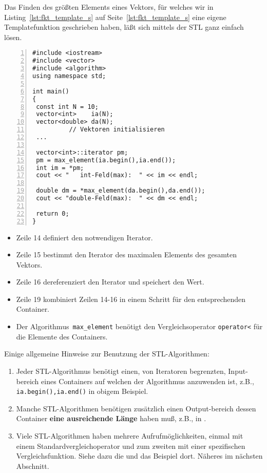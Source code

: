 Das Finden des größten Elements eines Vektors, für welches wir in Listing~\ref{lst:fkt_template_s}
auf Seite~\ref{lst:fkt_template_s} eine eigene Templatefunktion geschrieben haben, läßt sich mittels
der STL ganz einfach lösen.
\begin{lstlisting}[caption={Größter Vektoreintrag: STL anwenden.},label=lst:stl_b,
basicstyle=\scriptsize,numbers=left, numberstyle=\tiny, stepnumber=2, numbersep=5pt]
#include <iostream>
#include <vector>
#include <algorithm>
using namespace std;

int main()
{
 const int N = 10;
 vector<int>    ia(N);
 vector<double> da(N);
          // Vektoren initialisieren
 ...

 vector<int>::iterator pm;
 pm = max_element(ia.begin(),ia.end());
 int im = *pm;
 cout << "   int-Feld(max):  " << im << endl;

 double dm = *max_element(da.begin(),da.end());
 cout << "double-Feld(max):  " << dm << endl;

 return 0;
}
\end{lstlisting}
\begin{itemize}
    \item Zeile 14 definiert den notwendigen Iterator.
    \item Zeile 15 bestimmt den Iterator des maximalen Elements des gesamten Vektors.
    \item Zeile 16 dereferenziert den Iterator und speichert den Wert.
    \item Zeile 19 kombiniert Zeilen 14-16 in einem Schritt für den entsprechenden Container.
    \item Der Algorithmus~\verb|max_element| benötigt den Vergleichsoperator \verb|operator<|
    für die Elemente des Containers.
\end{itemize}

Einige allgemeine Hinweise zur Benutzung der STL-Algorithmen:
\begin{enumerate}
    \item Jeder STL-Algorithmus benötigt einen, von Iteratoren begrenzten, Input-bereich 
      eines Containers auf welchen der Algorithmus anzuwenden ist, z.B., \verb|ia.begin(),ia.end()| in 
      obigem Beispiel.
    \item Manche STL-Algorithmen benötigen zusätzlich einen Output-bereich dessen Container
     \textbf{eine ausreichende Länge} haben muß, z.B., in 
     . 
    \item Viele STL-Algorithmen haben mehrere Aufrufmöglichkeiten, einmal mit einem Standardvergleichoperator 
    und zum zweiten mit einer spezifischen Vergleichsfunktion. 
    Siehe dazu die  
    und das Beispiel dort. Näheres im nächsten Abschnitt.
\end{enumerate} 

